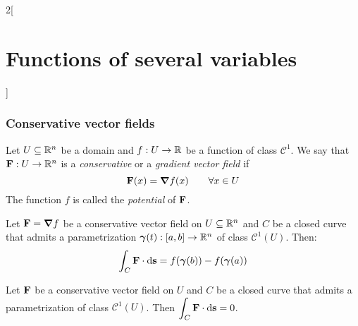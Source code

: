 \documentclass[../../../main_math.tex]{subfiles}
\begin{document}
\begin{multicols}{2}[\section{Functions of several variables}]
  \subsubsection{Conservative vector fields}
  \begin{definition}
    Let $U\subseteq\mathbb{R}^n$ be a domain and $f:U\rightarrow\mathbb{R} $ be a function of class $\mathcal{C}^1$. We say that $\boldsymbol{\mathrm{F}}:U\rightarrow\mathbb{R}^n$ is a \emph{conservative} or a \emph{gradient vector field} if $$\boldsymbol{\mathrm{F}}(x)=\grad f(x)\qquad \forall x\in U$$ The function $f$ is called the \emph{potential} of $\boldsymbol{\mathrm{F}}$.
  \end{definition}
  \begin{theorem}
    Let $\boldsymbol{\mathrm{F}}=\grad f$ be a conservative vector field on $U\subseteq\mathbb{R}^n$ and $C$ be a closed curve that admits a parametrization $\boldsymbol{\mathrm{\gamma}}(t):[a,b]\rightarrow\mathbb{R}^n$ of class $\mathcal{C}^1(U)$. Then: $$\int_C\boldsymbol{\mathrm{F}}\cdot \dd{\boldsymbol{\mathrm{s}}}=f(\boldsymbol{\mathrm{\gamma}}(b))-f(\boldsymbol{\mathrm{\gamma}}(a))$$
  \end{theorem}
  \begin{corollary}
    Let $\boldsymbol{\mathrm{F}}$ be a conservative vector field on $U$ and $C$ be a closed curve that admits a parametrization of class $\mathcal{C}^1(U)$. Then $\displaystyle\int_C\boldsymbol{\mathrm{F}}\cdot \dd{\boldsymbol{\mathrm{s}}}=0$.
  \end{corollary}

\end{multicols}
\end{document}
